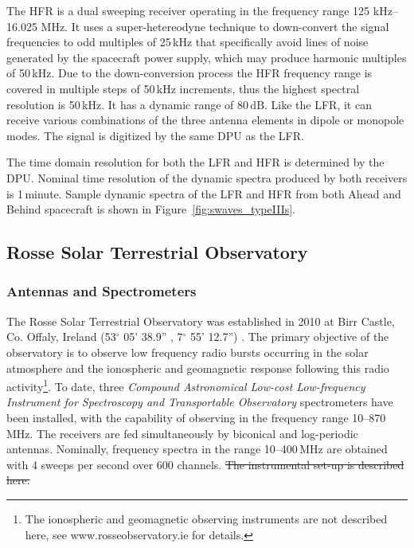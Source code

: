 The HFR is a dual sweeping receiver operating in the frequency range 125 kHz--16.025 MHz. It uses a super-hetereodyne technique to down-convert the signal frequencies to odd multiples of 25\,kHz that specifically avoid lines of noise generated by the spacecraft power supply, which may produce harmonic multiples of 50\,kHz. Due to the down-conversion process the HFR frequency range is covered in multiple steps of 50\,kHz increments, thus the highest spectral resolution is 50\,kHz. It has a dynamic range of 80\,dB. Like the LFR, it can receive various combinations of the three antenna elements in dipole or monopole modes. The signal is digitized by the same DPU as the LFR.

The time domain resolution for both the LFR and HFR is determined by the DPU. Nominal time resolution of the dynamic spectra produced by both receivers is 1\,minute. Sample dynamic spectra of the LFR and HFR from both Ahead and Behind spacecraft is shown in Figure~\ref{fig:swaves_typeIIIs}.



\subsection{Rosse Solar Terrestrial Observatory}\label{sec:30}

\subsubsection{Antennas and Spectrometers}
The Rosse Solar Terrestrial Observatory was established in 2010 at Birr Castle, Co. Offaly, Ireland (53$^{\circ}$ 05' 38.9'' , 7$^{\circ}$ 55' 12.7'') \citep{zucca2012}. The primary objective of the observatory is to observe low frequency radio bursts occurring in the solar atmosphere and the ionospheric and geomagnetic response following this radio activity\footnote{{\color{blue}The ionospheric and geomagnetic observing instruments are not described here, see www.rosseobservatory.ie for details.}}. To date, three \textit{Compound Astronomical Low-cost Low-frequency Instrument for Spectroscopy and Transportable Observatory} \citep[CALLISTO;][]{Benz2005} spectrometers have been installed, with the capability of observing in the frequency range 10--870\,MHz. The receivers are fed simultaneously by biconical and log-periodic antennas. Nominally, frequency spectra in the range 10--400\,MHz are obtained with 4 sweeps per second over 600 channels. \st{The instrumental set-up is described here.}

